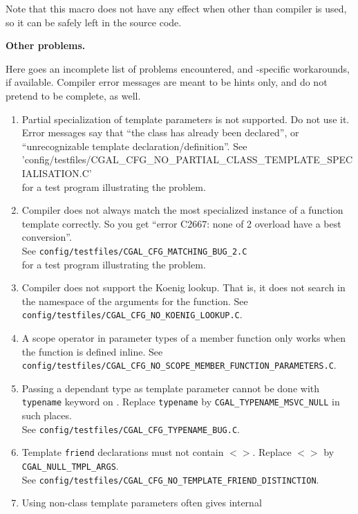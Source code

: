 Note that this macro does not have any effect when other than
 compiler is used, so it can be safely left in the source code. 
\medskip

\textbf{Other problems.}

Here goes an incomplete list of problems encountered, and
\cgal-specific workarounds, if available.  Compiler error messages are
meant to be hints only, and do not pretend to be complete, as well.
\begin{enumerate}
%
\item Partial specialization of template parameters is not
supported. Do not use it. Error messages say that ``the class has
already been declared'', or ``unrecognizable template
declaration/definition''. See
\nonlinkedpath'config/testfiles/CGAL_CFG_NO_PARTIAL_CLASS_TEMPLATE_SPECIALISATION.C'\\
 for a test program illustrating the problem. \label{msvc::parspec}
%
\item Compiler does not always match the most
specialized instance of a function template correctly. So you get
``error C2667: none of 2 overload have a best conversion''.\\
See \texttt{config/testfiles/CGAL\_CFG\_MATCHING\_BUG\_2.C} \\
for a test program illustrating the problem.\label{msvc::matchbug2}
%
\item Compiler does not support the Koenig
lookup. That is, it does not search in the namespace of the arguments for
the function. See
\texttt{config/testfiles/CGAL\_CFG\_NO\_KOENIG\_LOOKUP.C}. \label{msvc::koenig}
%
\item A scope operator in  parameter types of a member function only
works when the function is defined inline. See
\texttt{config/testfiles/CGAL\_CFG\_NO\_SCOPE\_MEMBER\_FUNCTION\_PARAMETERS.C}. 
\label{msvc::scopememberfunc}
%
\item Passing a dependant type as template parameter cannot be done
with \texttt{typename} keyword on \msvc. Replace \texttt{typename}
by \texttt{CGAL\_TYPENAME\_MSVC\_NULL} in such places.\\ 
See \texttt{config/testfiles/CGAL\_CFG\_TYPENAME\_BUG.C}. \label{msvc::typename}
%
\item Template \texttt{friend} declarations must not contain $<>$.
Replace $<>$  by \texttt{CGAL\_NULL\_TMPL\_ARGS}.\\
See \texttt{config/testfiles/CGAL\_CFG\_NO\_TEMPLATE\_FRIEND\_DISTINCTION}.
\label{msvc::friend}
%
\item Using non-class template parameters often gives internal

\end{enumerate}
